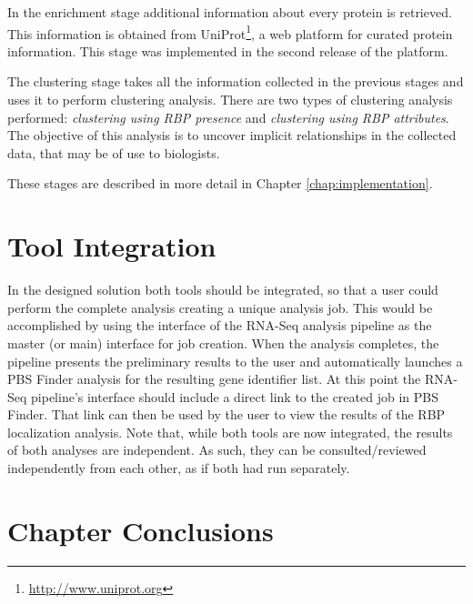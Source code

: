In the enrichment stage additional information about every protein is retrieved.
This information is obtained from
UniProt\footnote{\url{http://www.uniprot.org}}, a web platform for curated
protein information. This stage was implemented in the second release of the
platform.

The clustering stage takes all the information collected in the previous stages
and uses it to perform clustering analysis. There are two types of clustering
analysis performed: \emph{clustering using RBP presence} and \emph{clustering
using RBP attributes}. The objective of this analysis is to uncover implicit
relationships in the collected data, that may be of use to biologists.

These stages are described in more detail in Chapter \ref{chap:implementation}.

\section{Tool Integration}


In the designed solution both tools should be integrated, so that a user could
perform the complete analysis creating a unique analysis job. This would be
accomplished by using the interface of the RNA-Seq analysis pipeline as the
master (or main) interface for job creation. When the analysis completes, the
pipeline presents the preliminary results to the user and automatically launches
a PBS Finder analysis for the resulting gene identifier list. At this point the
RNA-Seq pipeline's interface should include a direct link to the created job in
PBS Finder. That link can then be used by the user to view the results of the
RBP localization analysis. Note that, while both tools are now integrated, the
results of both analyses are independent. As such, they can be
consulted/reviewed independently from each other, as if both had run separately.

\section{Chapter Conclusions}

